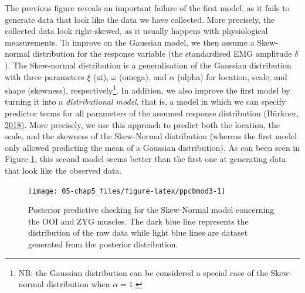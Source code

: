\documentclass[a4paper,12pt,twoside,openright,oldfontcommands,final]{memoir}
\let\rmarkdownfootnote\footnote%
\def\footnote{\protect\rmarkdownfootnote}
\begin{document}
The previous figure reveals an important failure of the first model, as it fails to generate data that look like the data we have collected. More precisely, the collected data look right-skewed, as it usually happens with physiological measurements. To improve on the Gaussian model, we then assume a Skew-normal distribution for the response variable (the standardised EMG amplitude \(\delta\)). The Skew-normal distribution is a generalisation of the Gaussian distribution with three parameters \(\xi\) (xi), \(\omega\) (omega), and \(\alpha\) (alpha) for location, scale, and shape (skewness), respectively\footnote{NB: the Gaussian distribution can be considered a special case of the Skew-normal distribution when \(\alpha = 1\).}. In addition, we also improve the first model by turning it into a \emph{distributional model}, that is, a model in which we can specify predictor terms for all parameters of the assumed response distribution (Bürkner, \protect\hyperlink{ref-R-brms}{2018}). More precisely, we use this approach to predict both the location, the scale, and the skewness of the Skew-Normal distribution (whereas the first model only allowed predicting the mean of a Gaussian distribution). As can been seen in Figure \ref{fig:ppcbmod3}, this second model seems better than the first one at generating data that look like the observed data.

\begin{figure}[H]

{\centering \texttt{[image: 05-chap5\_files/figure-latex/ppcbmod3-1]} 

}

\caption{Posterior predictive checking for the Skew-Normal model concerning the OOI and ZYG muscles. The dark blue line represents the distribution of the raw data while light blue lines are dataset generated from the posterior distribution.}\label{fig:ppcbmod3}
\end{figure}
\end{document}
